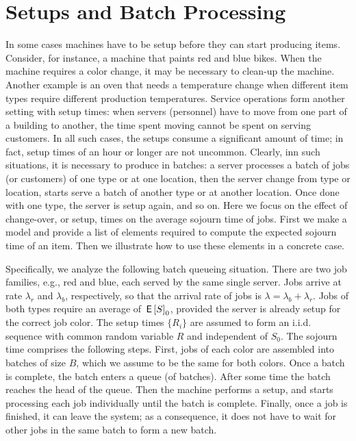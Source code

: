 \section{Setups and Batch Processing}
\label{sec:setups-batch-proc}



In some cases machines have to be setup before they can start producing items.
Consider, for instance, a machine that paints red and blue bikes.
When the machine requires a color change, it may be necessary to clean-up the machine.
Another example is an oven that needs a temperature change when different item types require different production temperatures.
Service operations form another setting with setup times: when servers (personnel) have to move from one part of a building to another, the time spent moving cannot be spent on serving customers.
In all such cases, the setups consume a significant amount of time; in fact, setup times of an hour or longer are not uncommon.
Clearly, inn such situations, it is necessary to produce in batches: a server processes a batch of jobs (or customers) of one type or at one location, then the server change from type or location, starts serve a batch of another type or at another location.
Once done with one type, the server is setup again, and so on.
Here we focus on the effect of change-over, or setup, times on the average sojourn time of jobs.
First we make a model and provide a list of elements required to compute the expected sojourn time of an item.
Then we illustrate how to use these elements in a concrete case.


Specifically, we analyze the following batch queueing situation.
There are two job families, e.g., red and blue, each served by the same single server.
Jobs arrive at rate $\lambda_r$ and $\lambda_b$, respectively, so that the arrival rate of jobs is $\lambda= \lambda_b+\lambda_r$.
Jobs of both types require an average  of $\,\mathsf{E}\left[S\right]_0$, provided the server is already setup for the correct job color.
The setup times $\{R_i\}$ are assumed to form an i.i.d.
sequence with common random variable $R$ and independent of $S_0$.
The sojourn time comprises the following steps.
First, jobs of each color are assembled into batches of size $B$, which we assume to be the same for both colors.
Once a batch is complete, the batch enters a queue (of batches).
After some time the batch reaches the head of the queue.
Then the machine performs a setup, and starts processing each job individually until the batch is complete.
Finally, once a job is finished, it can leave the system; as a consequence, it does not have to wait for other jobs in the same batch to form a new batch.




